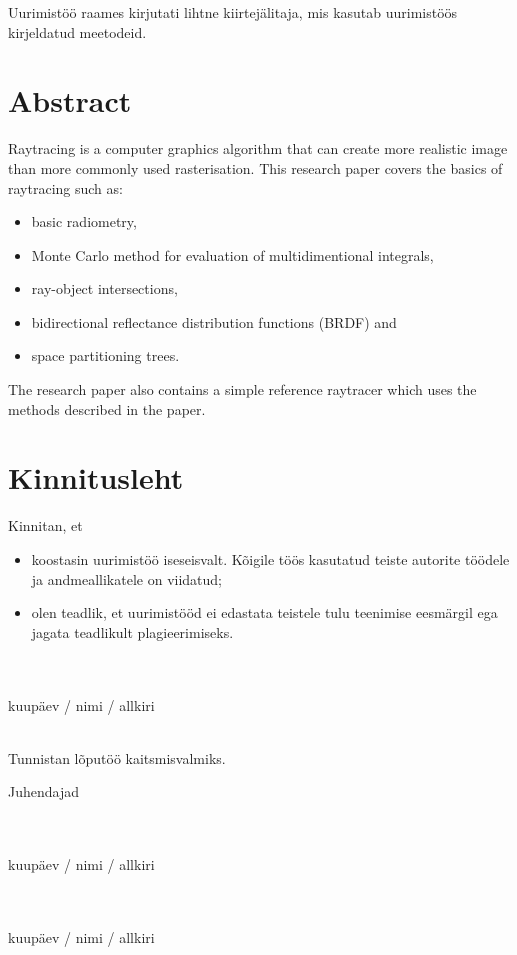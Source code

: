 \documentclass[a4paper,12pt]{report}
\begin{document}
Uurimistöö raames kirjutati lihtne kiirtejälitaja, mis kasutab uurimistöös
kirjeldatud meetodeid.

\chapter*{Abstract}
Raytracing is a computer graphics algorithm that can create more realistic
image than more commonly used rasterisation. This research paper covers
the basics of raytracing such as:
\begin{itemize}
\item basic radiometry,
\item Monte Carlo method for evaluation of multidimentional integrals,
\item ray-object intersections,
\item bidirectional reflectance distribution functions (BRDF) and
\item space partitioning trees.
\end{itemize}

The research paper also contains a simple reference raytracer which uses
the methods described in the paper.

\chapter*{Kinnitusleht}
Kinnitan, et
\begin{itemize}
\item koostasin uurimistöö iseseisvalt. Kõigile töös kasutatud teiste autorite töödele ja
andmeallikatele on viidatud;
\item olen teadlik, et uurimistööd ei edastata teistele tulu teenimise eesmärgil ega jagata
teadlikult plagieerimiseks.
\end{itemize}

\flushleft
~\\\dotfill\\
kuupäev / nimi / allkiri

~\\

Tunnistan lõputöö kaitsmisvalmiks.

Juhendajad

\flushleft
~\\\dotfill\\
kuupäev / nimi / allkiri

\flushleft
~\\\dotfill\\
kuupäev / nimi / allkiri
\end{document}

